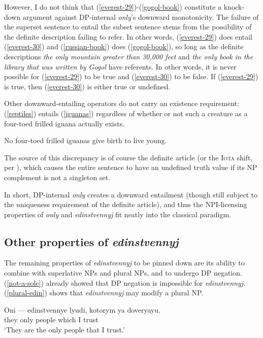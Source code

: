 \documentclass{article}
\begin{document}
However, I do not think that (\ref{everest-29})-(\ref{gogol-book}) constitute a knock-down argument against DP-internal \textit{only}'s downward monotonicity. The failure of the superset sentence to entail the subset sentence stems from the possibility of the definite description failing to refer. In other words, (\ref{everest-29}) does entail (\ref{everest-30}) and (\ref{russian-book}) does (\ref{gogol-book}), so long as the definite descriptions \textit{the only mountain greater than 30,000 feet} and \textit{the only book in the library that was written by Gogol} have referents. In other words, it is never possible for (\ref{everest-29}) to be true and (\ref{everest-30}) to be false. If (\ref{everest-29}) is true, then (\ref{everest-30}) is either true or undefined.

Other downward-entailing operators do not carry an existence requirement: (\ref{reptiles}) entails (\ref{iguanas}) regardless of whether or not such a creature as a four-toed frilled iguana actually exists.

\begin{exe}
	\ex \label{iguanas} No four-toed frilled iguanas give birth to live young.
\end{exe}

The source of this discrepancy is of course the definite article (or the \textsc{Iota} shift, per \citeauthor{cb2015}), which causes the entire sentence to have an undefined truth value if its NP complement is not a singleton set.

In short, DP-internal \textit{only} creates a downward entailment (though still subject to the uniqueness requirement of the definite article), and thus the NPI-licensing properties of \textit{only} and \textit{edinstvennyj} fit neatly into the classical paradigm.


\subsection{Other properties of \textit{edinstvennyj}}
The remaining properties of \textit{edinstvennyj} to be pinned down are its ability to combine with superlative NPs and plural NPs, and to undergo DP negation. (\ref{not-a-sole}) already showed that DP negation is impossible for \textit{edinstvennyj}. (\ref{plural-edin}) shows that \textit{edinstvennyj} may modify a plural NP.

\begin{exe}
	\ex \label{plural-edin} \gll Oni --- edinstvennye lyudi, kotorym ya doveryayu.\\
	they {} only people which I trust\\
	\glt `They are the only people that I trust.'
\end{exe}
\end{document}
